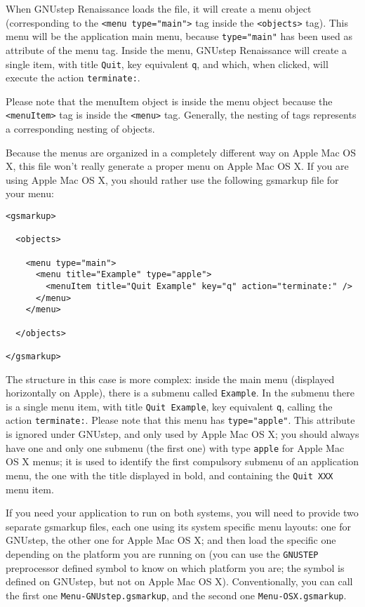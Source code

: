 \documentclass[a4paper]{article}
\begin{document}
When GNUstep Renaissance loads the file, it will create a menu object
(corresponding to the \texttt{<menu type="main">} tag inside the
\texttt{<objects>} tag).  This menu will be the application main menu,
because \texttt{type="main"} has been used as attribute of the menu
tag.  Inside the menu, GNUstep Renaissance will create a single item,
with title \texttt{Quit}, key equivalent \texttt{q}, and which, when
clicked, will execute the action \texttt{terminate:}.

Please note that the menuItem object is inside the menu object because
the \texttt{<menuItem>} tag is inside the \texttt{<menu>} tag.
Generally, the nesting of tags represents a corresponding nesting of
objects.

Because the menus are organized in a completely different way on Apple
Mac OS X, this file won't really generate a proper menu on Apple Mac
OS X.  If you are using Apple Mac OS X, you should rather use the following
gsmarkup file for your menu:
\begin{verbatim}
<gsmarkup>

  <objects>

    <menu type="main">
      <menu title="Example" type="apple">
        <menuItem title="Quit Example" key="q" action="terminate:" />
      </menu>
    </menu>
 
  </objects>

</gsmarkup>
\end{verbatim}
The structure in this case is more complex: inside the main menu
(displayed horizontally on Apple), there is a submenu called
\texttt{Example}.  In the submenu there is a single menu item, with
title \texttt{Quit Example}, key equivalent \texttt{q}, calling the
action \texttt{terminate:}.  Please note that this menu has
\texttt{type="apple"}.  This attribute is ignored under GNUstep, and
only used by Apple Mac OS X; you should always have one and only one
submenu (the first one) with type \texttt{apple} for Apple Mac OS X
menus; it is used to identify the first compulsory submenu of an
application menu, the one with the title displayed in bold, and
containing the \texttt{Quit XXX} menu item.

If you need your application to run on both systems, you will need to
provide two separate gsmarkup files, each one using its system
specific menu layouts: one for GNUstep, the other one for Apple Mac OS
X; and then load the specific one depending on the platform you are
running on (you can use the \texttt{GNUSTEP} preprocessor defined
symbol to know on which platform you are; the symbol is defined on
GNUstep, but not on Apple Mac OS X).  Conventionally, you can call the
first one \texttt{Menu-GNUstep.gsmarkup}, and the second one
\texttt{Menu-OSX.gsmarkup}.
\end{document}
